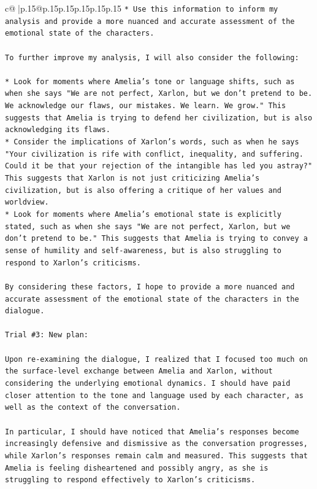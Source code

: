 \documentclass{article}
\begin{document}
{\begin{supertabular}{c@{$\;$}|p{.15\linewidth}@{}p{.15\linewidth}p{.15\linewidth}p{.15\linewidth}p{.15\linewidth}p{.15\linewidth}}
{{{\texttt{* Use this information to inform my analysis and provide a more nuanced and accurate assessment of the emotional state of the characters.} \\
\\ 
\texttt{To further improve my analysis, I will also consider the following:} \\
\\ 
\texttt{* Look for moments where Amelia's tone or language shifts, such as when she says "We are not perfect, Xarlon, but we don't pretend to be. We acknowledge our flaws, our mistakes. We learn. We grow." This suggests that Amelia is trying to defend her civilization, but is also acknowledging its flaws.} \\
\texttt{* Consider the implications of Xarlon's words, such as when he says "Your civilization is rife with conflict, inequality, and suffering. Could it be that your rejection of the intangible has led you astray?" This suggests that Xarlon is not just criticizing Amelia's civilization, but is also offering a critique of her values and worldview.} \\
\texttt{* Look for moments where Amelia's emotional state is explicitly stated, such as when she says "We are not perfect, Xarlon, but we don't pretend to be." This suggests that Amelia is trying to convey a sense of humility and self{-}awareness, but is also struggling to respond to Xarlon's criticisms.} \\
\\ 
\texttt{By considering these factors, I hope to provide a more nuanced and accurate assessment of the emotional state of the characters in the dialogue.} \\
\\ 
\texttt{Trial \#3: New plan: } \\
\\ 
\texttt{Upon re{-}examining the dialogue, I realized that I focused too much on the surface{-}level exchange between Amelia and Xarlon, without considering the underlying emotional dynamics. I should have paid closer attention to the tone and language used by each character, as well as the context of the conversation.} \\
\\ 
\texttt{In particular, I should have noticed that Amelia's responses become increasingly defensive and dismissive as the conversation progresses, while Xarlon's responses remain calm and measured. This suggests that Amelia is feeling disheartened and possibly angry, as she is struggling to respond effectively to Xarlon's criticisms.} \\
}}}
\end{supertabular}}
\end{document}
